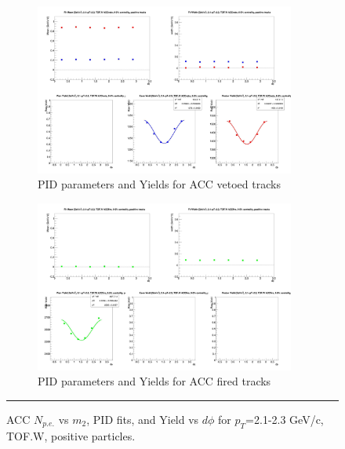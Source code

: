 \begin{figure}[H]
  \ContinuedFloat
    \vspace*{-1cm}
    \begin{subfigure}{1\textwidth}
   \centering
   \includegraphics[width=0.94\textwidth]{hiptfits/pos/fitParams_tof2_cent0_ch1_pT-21-23.jpg}
    \caption{PID parameters and Yields for ACC vetoed tracks}
    \end{subfigure}    
    \begin{subfigure}{1\textwidth}
   \centering
   \includegraphics[width=0.94\textwidth]{hiptfits/pos/fitParams_tof3_cent0_ch1_pT-21-23.jpg}
    \caption{PID parameters and Yields for ACC fired tracks}
    \end{subfigure} 
    \rule{35em}{0.5pt}
  \caption[ACC $N_{p.e.}$ vs $m_2$, PID fits, and Yield vs $d\phi$ for $p_T$=2.1-2.3 GeV/c, TOF.W, positive particles.]{ACC $N_{p.e.}$ vs $m_2$, PID fits, and Yield vs $d\phi$ for $p_T$=2.1-2.3 GeV/c, TOF.W, positive particles.}
  \label{fig:acc21-23pos}
\end{figure}


